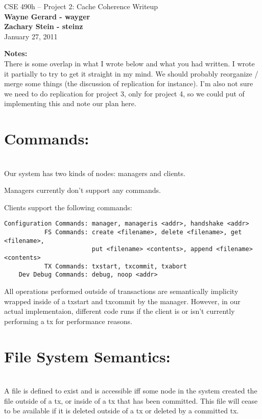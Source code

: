 \documentclass[11pt]{article}
\begin{document}
\begin{center}
{\large CSE 490h -- Project 2: Cache Coherence Writeup} \\
\textbf{Wayne Gerard - wayger} \\
\textbf{Zachary Stein - steinz} \\
January 27, 2011
\end{center}

\textbf{Notes:} \\

There is some overlap in what I wrote below and what you had written. I wrote it partially to try to get it straight in my mind. We should probably reorganize / merge some things (the discussion of replication for instance). I'm also not sure we need to do replication for project 3, only for project 4, so we could put of implementing this and note our plan here. \\

\section{Commands:} \\

Our system has two kinds of nodes: managers and clients.

Managers currently don't support any commands.

Clients support the following commands:
\begin{verbatim}
Configuration Commands: manager, manageris <addr>, handshake <addr>
           FS Commands: create <filename>, delete <filename>, get <filename>, 
                        put <filename> <contents>, append <filename> <contents>
           TX Commands: txstart, txcommit, txabort
    Dev Debug Commands: debug, noop <addr>
\end{verbatim}

All operations performed outside of transactions are semantically implicity wrapped inside of a txstart and txcommit by the manager. However, in our actual implementaion, different code runs if the client is or isn't currently performing a tx for performance reasons. \\

\section{File System Semantics:} \\

A file is defined to exist and is accessible iff some node in the system created the file outside of a tx, or inside of a tx that has been committed. 
This file will cease to be available if it is deleted outside of a tx or deleted by a committed tx.
\end{document}

